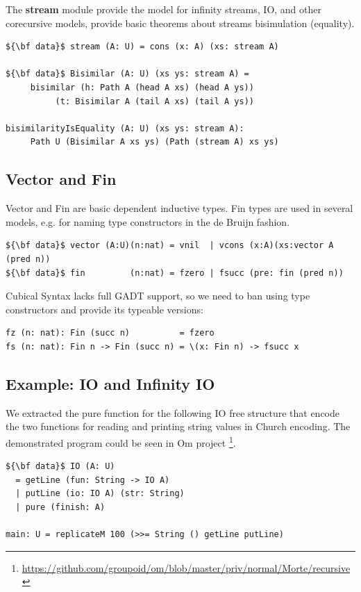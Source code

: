 \documentclass{article}
\begin{document}
The {\bf stream} module provide the model for infinity streams,
IO, and other corecursive models,
provide basic theorems about streams bisimulation (equality).

\begin{lstlisting}[mathescape=true]
${\bf data}$ stream (A: U) = cons (x: A) (xs: stream A)

${\bf data}$ Bisimilar (A: U) (xs ys: stream A) =
     bisimilar (h: Path A (head A xs) (head A ys))
          (t: Bisimilar A (tail A xs) (tail A ys))

bisimilarityIsEquality (A: U) (xs ys: stream A):
     Path U (Bisimilar A xs ys) (Path (stream A) xs ys)
\end{lstlisting}

\subsection{Vector and Fin}

Vector and Fin are basic dependent inductive types. Fin types are used
in several models, e.g. for naming type constructors in the de Bruijn fashion.

\begin{lstlisting}[mathescape=true]
${\bf data}$ vector (A:U)(n:nat) = vnil  | vcons (x:A)(xs:vector A (pred n))
${\bf data}$ fin         (n:nat) = fzero | fsucc (pre: fin (pred n))
\end{lstlisting}

Cubical Syntax lacks full GADT support, so we need to ban using
type constructors and provide its typeable versions:

\begin{lstlisting}[mathescape=true]
fz (n: nat): Fin (succ n)          = fzero
fs (n: nat): Fin n -> Fin (succ n) = \(x: Fin n) -> fsucc x
\end{lstlisting}

\subsection{Example: IO and Infinity IO}

We extracted the pure function for the following IO free structure
that encode the two functions for reading and printing string values in Church encoding.
The demonstrated program could be seen in Om project \footnote{\url{https://github.com/groupoid/om/blob/master/priv/normal/Morte/recursive}}.

\begin{lstlisting}[mathescape=true]
${\bf data}$ IO (A: U)
  = getLine (fun: String -> IO A)
  | putLine (io: IO A) (str: String)
  | pure (finish: A)

main: U = replicateM 100 (>>= String () getLine putLine)
\end{lstlisting}
\end{document}
